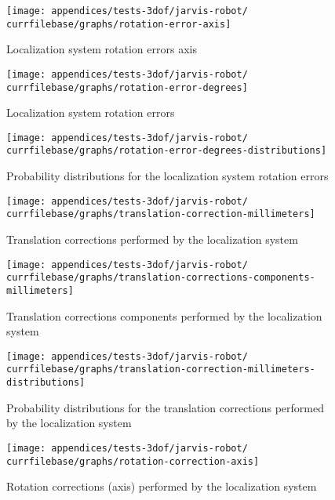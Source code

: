 \begin{figure}[H]
	\centering
	\texttt{[image: appendices/tests-3dof/jarvis-robot/\\currfilebase/graphs/rotation-error-axis]}
	\caption{Localization system rotation errors axis}
\end{figure}


\begin{figure}[H]
	\centering
	\texttt{[image: appendices/tests-3dof/jarvis-robot/\\currfilebase/graphs/rotation-error-degrees]}
	\caption{Localization system rotation errors}
\end{figure}


\begin{figure}[H]
	\centering
	\texttt{[image: appendices/tests-3dof/jarvis-robot/\\currfilebase/graphs/rotation-error-degrees-distributions]}
	\caption{Probability distributions for the localization system rotation errors}
\end{figure}


\begin{figure}[H]
	\centering
	\texttt{[image: appendices/tests-3dof/jarvis-robot/\\currfilebase/graphs/translation-correction-millimeters]}
	\caption{Translation corrections performed by the localization system}
\end{figure}

\begin{figure}[H]
	\centering
	\texttt{[image: appendices/tests-3dof/jarvis-robot/\\currfilebase/graphs/translation-corrections-components-millimeters]}
	\caption{Translation corrections components performed by the localization system}
\end{figure}

\begin{figure}[H]
	\centering
	\texttt{[image: appendices/tests-3dof/jarvis-robot/\\currfilebase/graphs/translation-correction-millimeters-distributions]}
	\caption{Probability distributions for the translation corrections performed by the localization system}
\end{figure}


\begin{figure}[H]
	\centering
	\texttt{[image: appendices/tests-3dof/jarvis-robot/\\currfilebase/graphs/rotation-correction-axis]}
	\caption{Rotation corrections (axis) performed by the localization system}
\end{figure}

